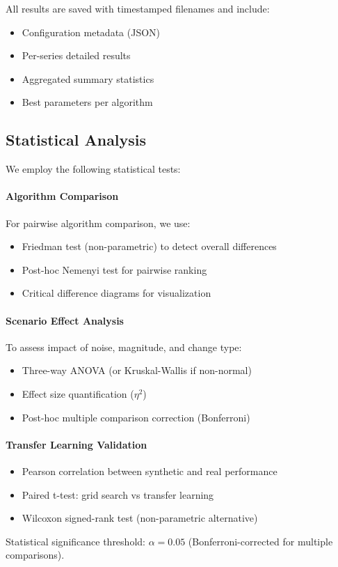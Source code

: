 All results are saved with timestamped filenames and include:
\begin{itemize}
    \item Configuration metadata (JSON)
    \item Per-series detailed results
    \item Aggregated summary statistics
    \item Best parameters per algorithm
\end{itemize}

\subsection{Statistical Analysis}
\label{sec:statistical_analysis}

We employ the following statistical tests:

\paragraph{Algorithm Comparison}

For pairwise algorithm comparison, we use:
\begin{itemize}
    \item Friedman test (non-parametric) to detect overall differences
    \item Post-hoc Nemenyi test for pairwise ranking
    \item Critical difference diagrams for visualization
\end{itemize}

\paragraph{Scenario Effect Analysis}

To assess impact of noise, magnitude, and change type:
\begin{itemize}
    \item Three-way ANOVA (or Kruskal-Wallis if non-normal)
    \item Effect size quantification ($\eta^2$)
    \item Post-hoc multiple comparison correction (Bonferroni)
\end{itemize}

\paragraph{Transfer Learning Validation}

\begin{itemize}
    \item Pearson correlation between synthetic and real performance
    \item Paired t-test: grid search vs transfer learning
    \item Wilcoxon signed-rank test (non-parametric alternative)
\end{itemize}

Statistical significance threshold: $\alpha = 0.05$ (Bonferroni-corrected for multiple comparisons).
